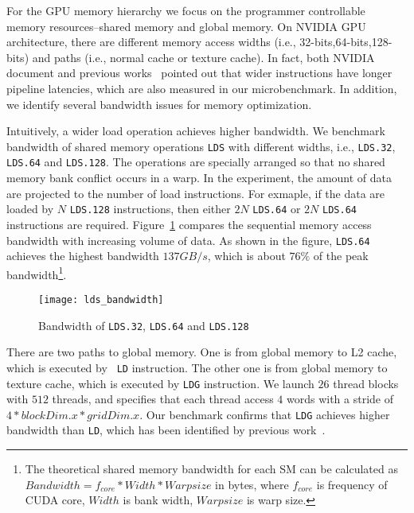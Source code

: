 For the GPU memory hierarchy we focus on the programmer controllable memory resources--shared memory and global memory. On NVIDIA GPU architecture, there are different memory access widths (i.e., 32-bits,64-bits,128-bits) and paths (i.e., normal cache or texture cache). In fact, both NVIDIA document and previous works~\cite{tan} pointed out that wider instructions have longer pipeline latencies, which are also measured in our microbenchmark. In addition, we identify several bandwidth issues for memory optimization.

Intuitively, a wider load operation achieves higher bandwidth. We benchmark bandwidth of shared memory operations {\tt LDS} with different widths, i.e., {\tt LDS.32}, {\tt LDS.64}
and {\tt LDS.128}. The operations are specially arranged so that no shared memory bank conflict occurs in a warp. In the
experiment, the amount of data are projected to the number of load instructions. For exmaple, if the data are loaded by
$N$ {\tt LDS.128} instructions, then either $2N$ {\tt LDS.64} or $2N$ {\tt LDS.64} instructions are required.
Figure~\ref{fig:lds_bw} compares the sequential memory access bandwidth with increasing volume of data. As shown in the figure, {\tt LDS.64} achieves the highest bandwidth $137GB/s$, which is about $76\%$ of the peak bandwidth\footnote{The theoretical shared memory bandwidth for each SM can be calculated as $Bandwidth=f_{core}*Width*Warpsize$ in
bytes, where $f_{core}$ is frequency of CUDA core, $Width$ is bank width, $Warpsize$ is warp size.}.

\begin{figure}[htbp]
\begin{center}
\texttt{[image: lds\_bandwidth]}
    \caption{ Bandwidth of {\tt LDS.32}, {\tt LDS.64} and {\tt LDS.128}}
\label{fig:lds_bw}
\end{center}
\end{figure}

There are two paths to global memory. One is from global memory to L2 cache, which is executed by {\tt
LD} instruction. The other one is from global memory to texture cache, which is executed by {\tt LDG} instruction. We
launch $26$ thread blocks with $512$ threads, and specifies that each thread access $4$ words with a stride of
$4*blockDim.x*gridDim.x$. Our benchmark confirms that {\tt LDG} achieves higher bandwidth than {\tt LD}, which has been
identified by previous work~\cite{tan}.
